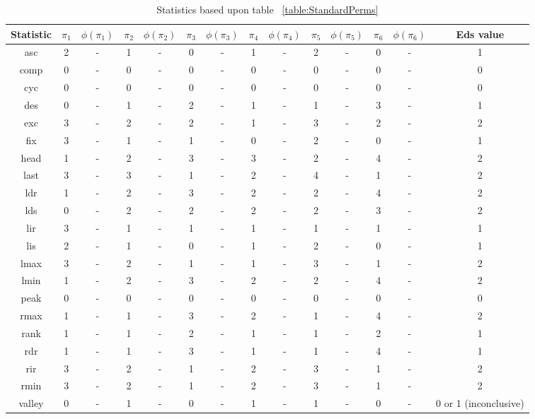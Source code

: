 \documentclass[12pt]{article}
\begin{document}
\begin{table}[H]
\caption{Statistics based upon table ~\ref{table:StandardPerms}}
\centering
\tabcolsep=0.11cm
\begin{tabular}{c | c c c c c c c c c c c c | c}
\hline\hline
Statistic & $\pi_1$ & $\phi(\pi_1)$ & $\pi_2$ & $\phi(\pi_2)$ & $\pi_3$ & $\phi(\pi_3)$ & $\pi_4$ & $\phi(\pi_4)$ & $\pi_5$ & $\phi(\pi_5)$ & $\pi_6$ & $\phi(\pi_6)$ & Eds value\\ [0.5ex]
\hline
asc & 2 & - & 1 & - & 0 & - & 1 & - & 2 & - & 0 & - & 1\\ 
comp & 0 & - & 0 & - & 0 & - & 0 & - & 0 & - & 0 & - & 0\\
cyc & 0 & - & 0 & - & 0 & - & 0 & - & 0 & - & 0 & - & 0\\
des & 0 & - & 1 & - & 2 & - & 1 & - & 1 & - & 3 & - & 1\\
exc & 3 & - & 2 & - & 2 & - & 1 & - & 3 & - & 2 & - & 2\\
fix & 3 & - & 1 & - & 1 & - & 0 & - & 2 & - & 0 & - & 1\\
head & 1 & - & 2 & - & 3 & - & 3 & - & 2 & - & 4 & - & 2\\
last & 3 & - & 3 & - & 1 & - & 2 & - & 4 & - & 1 & - & 2\\
ldr & 1 & - & 2 & - & 3 & - & 2 & - & 2 & - & 4 & - & 2\\
lds & 0 & - & 2 & - & 2 & - & 2 & - & 2 & - & 3 & - & 2\\
lir & 3 & - & 1 & - & 1 & - & 1 & - & 1 & - & 1 & - & 1\\
lis & 2 & - & 1 & - & 0 & - & 1 & - & 2 & - & 0 & - & 1\\
lmax & 3 & - & 2 & - & 1 & - & 1 & - & 3 & - & 1 & - & 2\\
lmin & 1 & - & 2 & - & 3 & - & 2 & - & 2 & - & 4 & - & 2\\
peak & 0 & - & 0 & - & 0 & - & 0 & - & 0 & - & 0 & - & 0\\
rmax & 1 & - & 1 & - & 3 & - & 2 & - & 1 & - & 4 & - & 2\\
rank & 1 & - & 1 & - & 2 & - & 1 & - & 1 & - & 2 & - & 1\\
rdr & 1 & - & 1 & - & 3 & - & 1 & - & 1 & - & 4 & - & 1\\
rir & 3 & - & 2 & - & 1 & - & 2 & - & 3 & - & 1 & - & 2\\
rmin & 3 & - & 2 & - & 1 & - & 2 & - & 3 & - & 1 & - & 2\\
valley & 0 & - & 1 & - & 0 & - & 1 & - & 1 & - & 0 & - & 0 or 1 (inconclusive)\\

\end{tabular}
\end{table}
\end{document}
